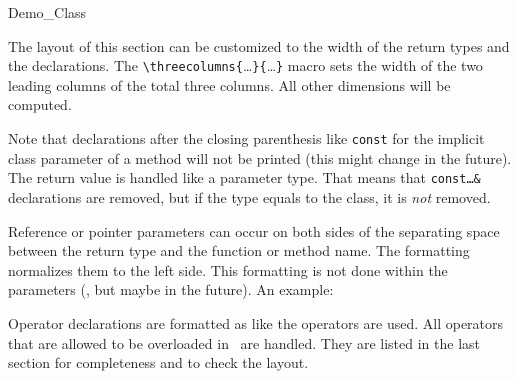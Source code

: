 \documentclass[12pt]{article}
\begin{document}
\begin{CCclass}{Demo_Class}
{  \CCoperations
  \CCsetTwoOfThreeColumns{2.8cm}{2.8cm}

The layout of this section can be customized to the width of the
return types and the declarations. The
\verb"\"\verb"threecolumns{"\ldots\verb"}{"\ldots\verb"}" macro sets the
width of the two leading columns of the total three columns. All other
dimensions will be computed.

Note that declarations after the closing parenthesis like {\tt const}
for the implicit class parameter of a method will not be printed
(this might change in the future).
The return value is handled like a parameter type. That means that
{\tt const\ldots\&} declarations are removed, but if the type equals
to the class, it is {\em not} removed.






Reference or pointer parameters can occur on both sides of the
separating space between the return type and the function or method
name. The formatting normalizes them to the left side. This
formatting is not done within the parameters (, but maybe in the
future). An example: 





Operator declarations are formatted as like the operators are
used.  All operators that are allowed to be overloaded in \CC\ are
handled. They are listed in the last section for completeness and
to check the layout. 

}
\end{CCclass}
\end{document}
